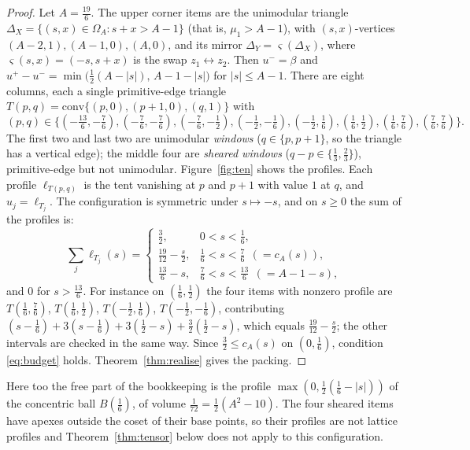 \documentclass[11pt]{amsart}
\begin{document}
\begin{proof}
Let $A=\frac{19}6$. The upper corner items are the unimodular triangle $\Delta_X=\{(s,x)\in\Omega_A:s+x>A-1\}$
(that is, $\mu_1>A-1$), with $(s,x)$-vertices $(A-2,1),(A-1,0),(A,0)$, and its mirror $\Delta_Y=\varsigma(\Delta_X)$,
where $\varsigma(s,x)=(-s,s+x)$ is the swap $z_1\leftrightarrow z_2$. Then
$u^-=\beta$ and $u^+-u^-=\min\bigl(\frac12(A-|s|),\,A-1-|s|\bigr)$ for $|s|\le A-1$. There are eight
columns, each a single primitive-edge triangle $T(p,q)=\mathrm{conv}\{(p,0),(p+1,0),(q,1)\}$ with
\[
(p,q)\in\bigl\{(-\tfrac{13}6,-\tfrac76),(-\tfrac76,-\tfrac76),(-\tfrac76,-\tfrac12),(-\tfrac12,-\tfrac16),
(-\tfrac12,\tfrac16),(\tfrac16,\tfrac12),(\tfrac16,\tfrac76),(\tfrac76,\tfrac76)\bigr\}.
\]
The first two and last two are unimodular \emph{windows} ($q\in\{p,p+1\}$, so the triangle has a vertical
edge); the middle four are \emph{sheared windows} ($q-p\in\{\frac13,\frac23\}$), primitive-edge but not unimodular.
Figure~\ref{fig:ten} shows the profiles. Each profile $\ell_{T(p,q)}$ is the tent
vanishing at $p$ and $p+1$ with value $1$ at $q$, and $u_j=\ell_{T_j}$. The configuration is symmetric under
$s\mapsto-s$, and on $s\ge0$ the sum of the profiles is:
\[
\textstyle\sum_j\ell_{T_j}(s)=
\begin{cases}
\frac32,&0<s<\frac16,\\
\frac{19}{12}-\frac s2,&\frac16<s<\frac76\ \ (=c_A(s)),\\
\frac{13}6-s,&\frac76<s<\frac{13}6\ \ (=A-1-s),
\end{cases}
\]
and $0$ for $s>\frac{13}6$. For instance on $(\frac16,\frac12)$ the four items with nonzero profile are
$T(\frac16,\frac76)$, $T(\frac16,\frac12)$, $T(-\frac12,\frac16)$, $T(-\frac12,-\frac16)$, contributing
$(s-\frac16)+3(s-\frac16)+3(\frac12-s)+\frac32(\frac12-s)$, which equals $\frac{19}{12}-\frac s2$; the other intervals are checked in the same way. Since
$\frac32\le c_A(s)$ on $(0,\frac16)$, condition \eqref{eq:budget} holds. Theorem~\ref{thm:realise} gives the packing.
\end{proof}

Here too the free part of the bookkeeping is the profile $\max(0,\frac12(\frac16-|s|))$ of the concentric ball
$B(\frac16)$, of volume $\frac1{72}=\frac12(A^2-10)$. The four sheared items have apexes outside the coset of
their base points, so their profiles are not lattice profiles and Theorem~\ref{thm:tensor} below does not apply
to this configuration.
\end{document}
